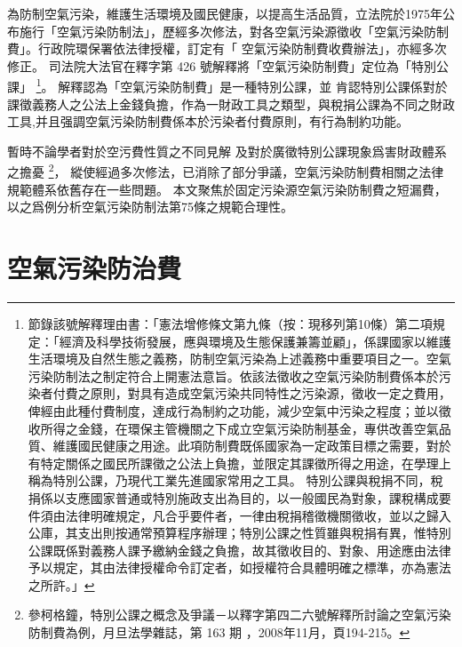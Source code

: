 \documentclass[11pt,a4paper]{article}
\begin{document}
為防制空氣污染，維護生活環境及國民健康，以提高生活品質，立法院於1975年公布施行「空氣污染防制法」，歷經多次修法，對各空氣污染源徵收「空氣污染防制費」。行政院環保署依法律授權，訂定有「	空氣污染防制費收費辦法」，亦經多次修正。
司法院大法官在釋字第 426 號解釋將「空氣污染防制費」定位為「特別公課」
\footnote{節錄該號解釋理由書：「憲法增修條文第九條（按：現移列第10條）第二項規定：「經濟及科學技術發展，應與環境及生態保護兼籌並顧」，係課國家以維護生活環境及自然生態之義務，防制空氣污染為上述義務中重要項目之一。空氣污染防制法之制定符合上開憲法意旨。依該法徵收之空氣污染防制費係本於污染者付費之原則，對具有造成空氣污染共同特性之污染源，徵收一定之費用，俾經由此種付費制度，達成行為制約之功能，減少空氣中污染之程度；並以徵收所得之金錢，在環保主管機關之下成立空氣污染防制基金，專供改善空氣品質、維護國民健康之用途。此項防制費既係國家為一定政策目標之需要，對於有特定關係之國民所課徵之公法上負擔，並限定其課徵所得之用途，在學理上稱為特別公課，乃現代工業先進國家常用之工具。
特別公課與稅捐不同，稅捐係以支應國家普通或特別施政支出為目的，以一般國民為對象，課稅構成要件須由法律明確規定，凡合乎要件者，一律由稅捐稽徵機關徵收，並以之歸入公庫，其支出則按通常預算程序辦理；特別公課之性質雖與稅捐有異，惟特別公課既係對義務人課予繳納金錢之負擔，故其徵收目的、對象、用途應由法律予以規定，其由法律授權命令訂定者，如授權符合具體明確之標準，亦為憲法之所許。」}。
解釋認為「空氣污染防制費」是一種特別公課，並
肯認特別公課係對於課徵義務人之公法上金錢負擔，作為一財政工具之類型，與稅捐公課為不同之財政工具,并且强調空氣污染防制費係本於污染者付費原則，有行為制約功能。


暫時不論學者對於空污費性質之不同見解
及對於廣徵特別公課現象爲害財政體系之擔憂
\footnote{參柯格鐘，特別公課之概念及爭議－以釋字第四二六號解釋所討論之空氣污染防制費為例，月旦法學雜誌，第 163 期 ，2008年11月，頁194-215。}，
縱使經過多次修法，已消除了部分爭議，空氣污染防制費相關之法律規範體系依舊存在一些問題。
本文聚焦於固定污染源空氣污染防制費之短漏費，以之爲例分析空氣污染防制法第75條之規範合理性。


\section{空氣污染防治費}
\end{document}
